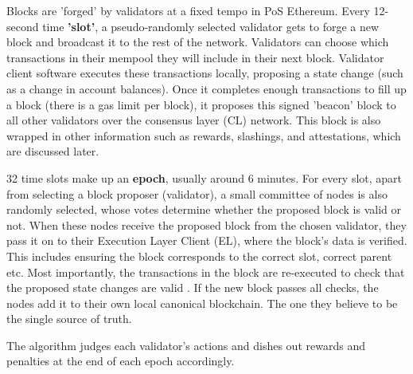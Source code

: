 Blocks are 'forged' by validators at a fixed tempo in PoS Ethereum. Every 12-second time \textbf{'slot'}, a pseudo-randomly selected validator gets to forge a new block and broadcast it to the rest of the network. Validators can choose which transactions in their mempool they will include in their next block. Validator client software executes these transactions locally, proposing a state change (such as a change in account balances). Once it completes enough transactions to fill up a block (there is a gas limit per block), it proposes this signed 'beacon' block to all other validators over the consensus layer (CL) network. This block is also wrapped in other information such as rewards, slashings, and attestations, which are discussed later.

32 time slots make up an \textbf{epoch}, usually around 6 minutes. For every slot, apart from selecting a block proposer (validator), a small committee of nodes is also randomly selected, whose votes determine whether the proposed block is valid or not. When these nodes receive the proposed block from the chosen validator, they pass it on to their Execution Layer Client (EL), where the block's data is verified. This includes ensuring the block corresponds to the correct slot, correct parent etc. Most importantly, the transactions in the block are re-executed to check that the proposed state changes are valid \cite{EthereumEthereum.org}. If the new block passes all checks, the nodes add it to their own local canonical blockchain. The one they believe to be the single source of truth. 

The algorithm judges each validator's actions and dishes out rewards and penalties at the end of each epoch accordingly. 




